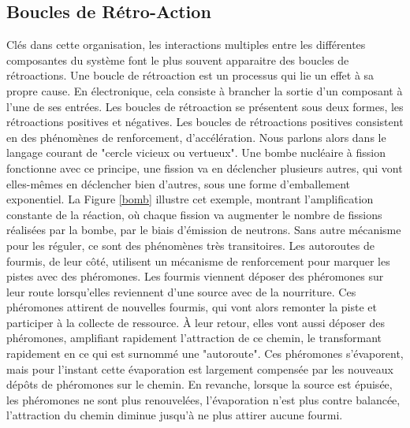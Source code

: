 			\subsection{Boucles de Rétro-Action}
		
		Clés dans cette organisation, les interactions multiples entre les différentes composantes du système font le plus souvent apparaitre des boucles de rétroactions. Une boucle de rétroaction est un processus qui lie un effet à sa propre cause. En électronique, cela consiste à brancher la sortie d'un composant à l'une de ses entrées. Les boucles de rétroaction se présentent sous deux formes, les rétroactions positives et négatives. Les boucles de rétroactions positives consistent en des phénomènes de renforcement, d'accélération. Nous parlons alors dans le langage courant de "cercle vicieux ou vertueux". Une bombe nucléaire à fission fonctionne avec ce principe, une fission va en déclencher plusieurs autres, qui vont elles-mêmes en déclencher bien d'autres, sous une forme d'emballement exponentiel. La Figure \ref{bomb} illustre cet exemple, montrant l'amplification constante de la réaction, où chaque fission va augmenter le nombre de fissions réalisées par la bombe, par le biais d'émission de neutrons. Sans autre mécanisme pour les réguler, ce sont des phénomènes très transitoires. Les autoroutes de fourmis, de leur côté, utilisent un mécanisme de renforcement pour marquer les pistes avec des phéromones. Les fourmis viennent déposer des phéromones sur leur route lorsqu'elles reviennent d'une source avec de la nourriture. Ces phéromones attirent de nouvelles fourmis, qui vont alors remonter la piste et participer à la collecte de ressource. À leur retour, elles vont aussi déposer des phéromones, amplifiant rapidement l'attraction de ce chemin, le transformant rapidement en ce qui est surnommé une "autoroute". Ces phéromones s'évaporent, mais pour l'instant cette évaporation est largement compensée par les nouveaux dépôts de phéromones sur le chemin. En revanche, lorsque la source est épuisée, les phéromones ne sont plus renouvelées, l'évaporation n'est plus contre balancée, l'attraction du chemin diminue jusqu'à ne plus attirer aucune fourmi.
